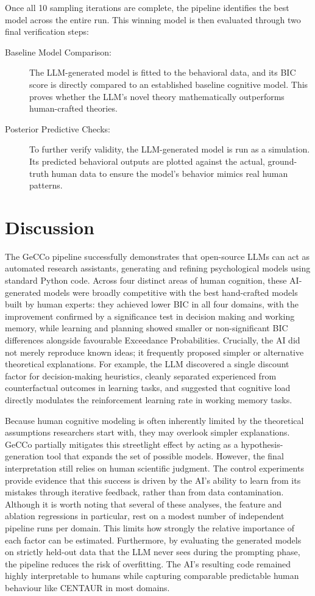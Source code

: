 Once all 10 sampling iterations are complete, the pipeline identifies the best model across the entire run. This winning model is then evaluated through two final verification steps:

\begin{description}
    \item[Baseline Model Comparison:] The LLM-generated model is fitted to the behavioral data, and its BIC score is directly compared to an established baseline cognitive model. This proves whether the LLM's novel theory mathematically outperforms human-crafted theories.
    \item[Posterior Predictive Checks:] To further verify validity, the LLM-generated model is run as a simulation. Its predicted behavioral outputs are plotted against the actual, ground-truth human data to ensure the model's behavior mimics real human patterns.
\end{description}
\section{Discussion}
The GeCCo pipeline successfully demonstrates that open-source LLMs can act as automated research assistants, generating and refining psychological models using standard Python code. Across four distinct areas of human cognition, these AI-generated models were broadly competitive with the best hand-crafted models built by human experts: they achieved lower BIC in all four domains, with the improvement confirmed by a significance test in decision making and working memory, while learning and planning showed smaller or non-significant BIC differences alongside favourable Exceedance Probabilities. Crucially, the AI did not merely reproduce known ideas; it frequently proposed simpler or alternative theoretical explanations. For example, the LLM discovered a single discount factor for decision-making heuristics, cleanly separated experienced from counterfactual outcomes in learning tasks, and suggested that cognitive load directly modulates the reinforcement learning rate in working memory tasks. 

Because human cognitive modeling is often inherently limited by the theoretical assumptions researchers start with, they may overlook simpler explanations. GeCCo partially mitigates this streetlight effect by acting as a hypothesis-generation tool that expands the set of possible models. However, the final interpretation still relies on human scientific judgment. The control experiments provide evidence that this success is driven by the AI's ability to learn from its mistakes through iterative feedback, rather than from data contamination. Although it is worth noting that several of these analyses, the feature and ablation regressions in particular, rest on a modest number of independent pipeline runs per domain. This limits how strongly the relative importance of each factor can be estimated. Furthermore, by evaluating the generated models on strictly held-out data that the LLM never sees during the prompting phase, the pipeline reduces the risk of overfitting. The AI's resulting code remained highly interpretable to humans while capturing comparable predictable human behaviour like CENTAUR in most domains.

